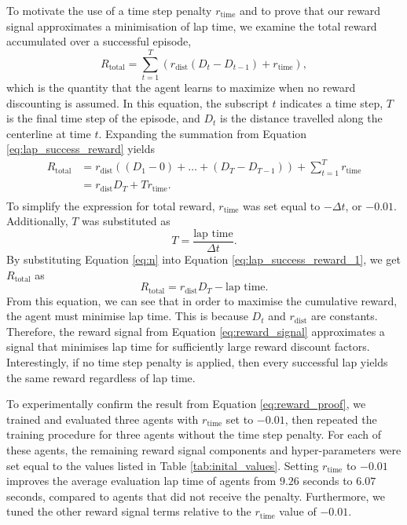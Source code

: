 To motivate the use of a time step penalty $r_{\text{time}}$ and to prove that our reward signal approximates a minimisation of lap time, we examine the total reward accumulated over a successful episode, 
\begin{equation}
        R_{\text{total}} =  \sum_{t=1}^{T} \left( r_{\text{dist}}(D_{t}-D_{t-1})+r_{\text{time}} \right),
\label{eq:lap_success_reward}
\end{equation}
which is the quantity that the agent learns to maximize when no reward discounting is assumed. 
In this equation, the subscript $t$ indicates a time step, $T$ is the final time step of the episode, and $D_t$ is the distance travelled along the centerline at time $t$.
Expanding the summation from Equation \ref{eq:lap_success_reward} yields
\begin{equation}
    \begin{split}
        R_{\text{total}}
        &= r_{\text{dist}} \left( (D_1-0) + \ldots + (D_{T} - D_{T-1}) \right) + \sum_{t=1}^{T} r_{\text{time}} \\
        &= r_{\text{dist}} D_T  + T r_{\text{time}}. \\
    \end{split}
\label{eq:lap_success_reward_1}
\end{equation}
To simplify the expression for total reward, $r_{\text{time}}$ was set equal to $-\Delta t$, or $-0.01$.
Additionally, $T$ was substituted as
\begin{equation}
T=\frac{\text{lap time}}{\Delta t}.
\label{eq:n}
\end{equation}
By substituting Equation \ref{eq:n} into Equation \ref{eq:lap_success_reward_1}, we get $R_{\text{total}}$ as
\begin{equation}\label{eq:reward_proof}
    R_{\text{total}} = r_{\text{dist}} D_T - \text{lap time}.
\end{equation}
From this equation, we can see that in order to maximise the cumulative reward, the agent must minimise lap time.
This is because $D_t$ and $r_{\text{dist}}$ are constants.
Therefore, the reward signal from Equation \ref{eq:reward_signal} approximates a signal that minimises lap time for sufficiently large reward discount factors.
Interestingly, if no time step penalty is applied, then every successful lap yields the same reward regardless of lap time.

To experimentally confirm the result from Equation \ref{eq:reward_proof}, we trained and evaluated three agents with $r_{\text{time}}$ set to $-0.01$, then repeated the training procedure for three agents without the time step penalty.
For each of these agents, the remaining reward signal components and hyper-parameters were set equal to the values listed in Table \ref{tab:inital_values}.
Setting $r_{\text{time}}$ to $-0.01$ improves the average evaluation lap time of agents from $9.26$ seconds to $6.07$ seconds, compared to agents that did not receive the penalty.
Furthermore, we tuned the other reward signal terms relative to the $r_{\text{time}}$ value of $-0.01$.


